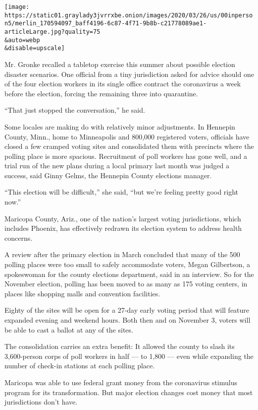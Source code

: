 \texttt{[image: https://static01.graylady3jvrrxbe.onion/images/2020/03/26/us/00inperson5/merlin\_170594097\_baff4196-6c87-4f71-9b8b-c21778089ae1-articleLarge.jpg?quality=75\\\&auto=webp\\\&disable=upscale]}

Mr. Gronke recalled a tabletop exercise this summer about possible
election disaster scenarios. One official from a tiny jurisdiction asked
for advice should one of the four election workers in its single office
contract the coronavirus a week before the election, forcing the
remaining three into quarantine.

``That just stopped the conversation,'' he said.

Some locales are making do with relatively minor adjustments. In
Hennepin County, Minn., home to Minneapolis and 800,000 registered
voters, officials have closed a few cramped voting sites and
consolidated them with precincts where the polling place is more
spacious. Recruitment of poll workers has gone well, and a trial run of
the new plans during a local primary last month was judged a success,
said Ginny Gelms, the Hennepin County elections manager.

``This election will be difficult,'' she said, ``but we're feeling
pretty good right now.''

Maricopa County, Ariz., one of the nation's largest voting
jurisdictions, which includes Phoenix, has effectively redrawn its
election system to address health concerns.

A review after the primary election in March concluded that many of the
500 polling places were too small to safely accommodate voters, Megan
Gilbertson, a spokeswoman for the county elections department, said in
an interview. So for the November election, polling has been moved to as
many as 175 voting centers, in places like shopping malls and convention
facilities.

Eighty of the sites will be open for a 27-day early voting period that
will feature expanded evening and weekend hours. Both then and on
November 3, voters will be able to cast a ballot at any of the sites.

The consolidation carries an extra benefit: It allowed the county to
slash its 3,600-person corps of poll workers in half --- to 1,800 ---
even while expanding the number of check-in stations at each polling
place.

Maricopa was able to use federal grant money from the coronavirus
stimulus program for its transformation. But major election changes cost
money that most jurisdictions don't have.

